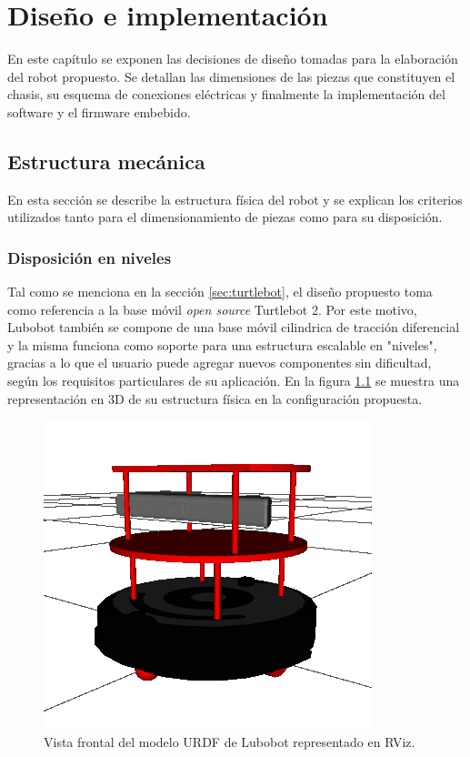 \chapter{Diseño e implementación}

\label{Capitulo3}

En este capítulo se exponen las decisiones de diseño tomadas para la elaboración del robot propuesto. Se detallan las dimensiones de las piezas que constituyen el chasis, su esquema de conexiones eléctricas y finalmente la implementación del software y el firmware embebido.

\section{Estructura mecánica}

En esta sección se describe la estructura física del robot y se explican los criterios utilizados tanto para el dimensionamiento de piezas como para su disposición.

\subsection{Disposición en niveles}
Tal como se menciona en la sección \ref{sec:turtlebot}, el diseño propuesto toma como referencia a la base móvil \textit{open source} Turtlebot 2. Por este motivo, Lubobot también se compone de una base móvil cilindrica de tracción diferencial y la misma funciona como soporte para una estructura escalable en "niveles", gracias a lo que el usuario puede agregar nuevos componentes sin dificultad, según los requisitos particulares de su aplicación. En la figura \ref{fig:lubobotURDF} se muestra una representación en 3D de su estructura física en la configuración propuesta.

\begin{figure}[ht]
  \centering
  \includegraphics[scale=0.5]{./Figures/lubobot_urdf.png}
  \caption{Vista frontal del modelo URDF de Lubobot representado en RViz.}
  \label{fig:lubobotURDF}
\end{figure}

